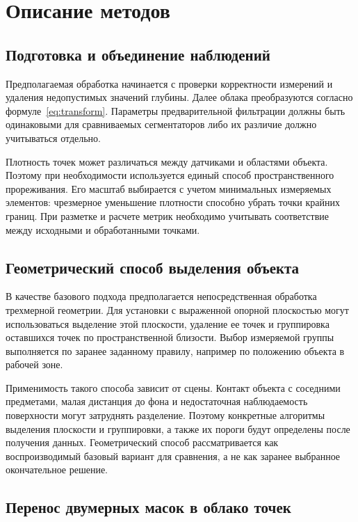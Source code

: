 \documentclass{misisarticle}
\begin{document}
\section{Описание методов}

\subsection{Подготовка и объединение наблюдений}

Предполагаемая обработка начинается с проверки корректности измерений и удаления недопустимых значений глубины. Далее облака преобразуются согласно формуле~\eqref{eq:transform}. Параметры предварительной фильтрации должны быть одинаковыми для сравниваемых сегментаторов либо их различие должно учитываться отдельно.

Плотность точек может различаться между датчиками и областями объекта. Поэтому при необходимости используется единый способ пространственного прореживания. Его масштаб выбирается с учетом минимальных измеряемых элементов: чрезмерное уменьшение плотности способно убрать точки крайних границ. При разметке и расчете метрик необходимо учитывать соответствие между исходными и обработанными точками.

\subsection{Геометрический способ выделения объекта}

В качестве базового подхода предполагается непосредственная обработка трехмерной геометрии. Для установки с выраженной опорной плоскостью могут использоваться выделение этой плоскости, удаление ее точек и группировка оставшихся точек по пространственной близости. Выбор измеряемой группы выполняется по заранее заданному правилу, например по положению объекта в рабочей зоне.

Применимость такого способа зависит от сцены. Контакт объекта с соседними предметами, малая дистанция до фона и недостаточная наблюдаемость поверхности могут затруднять разделение. Поэтому конкретные алгоритмы выделения плоскости и группировки, а также их пороги будут определены после получения данных. Геометрический способ рассматривается как воспроизводимый базовый вариант для сравнения, а не как заранее выбранное окончательное решение.

\subsection{Перенос двумерных масок в облако точек}
\end{document}
